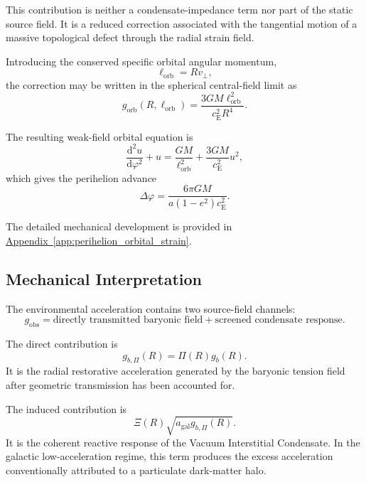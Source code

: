 This contribution is neither a condensate-impedance term nor part of the static source field. It is a reduced correction associated with the tangential motion of a massive topological defect through the radial strain field.

Introducing the conserved specific orbital angular momentum,
\begin{equation}
    \ell_{\mathrm{orb}} = Rv_\perp,
\end{equation}
the correction may be written in the spherical central-field limit as
\begin{equation}
    g_{\mathrm{orb}}(R,\ell_{\mathrm{orb}}) = \frac{3GM\ell_{\mathrm{orb}}^2}{c_{\mathrm{E}}^2R^4}.
\end{equation}

The resulting weak-field orbital equation is
\begin{equation}
    \frac{\mathrm{d}^2u}{\mathrm{d}\varphi^2} + u = \frac{GM}{\ell_{\mathrm{orb}}^2} + \frac{3GM}{c_{\mathrm{E}}^2}u^2,
\end{equation}
which gives the perihelion advance
\begin{equation}
    \Delta\varphi = \frac{6\pi GM}{a(1-e^2)c_{\mathrm{E}}^2}.
\end{equation}

The detailed mechanical development is provided in \hyperref[app:perihelion_orbital_strain]{Appendix~\ref*{app:perihelion_orbital_strain}}.

\subsection{Mechanical Interpretation}

The environmental acceleration contains two source-field channels:
\begin{equation}
    g_{\mathrm{obs}} = \text{directly transmitted baryonic field} + \text{screened condensate response}.
\end{equation}

The direct contribution is
\begin{equation}
    g_{b,\Pi}(R) = \Pi(R)g_b(R).
\end{equation}
It is the radial restorative acceleration generated by the baryonic tension field after geometric transmission has been accounted for.

The induced contribution is
\begin{equation}
    \Xi(R) \sqrt{ a_{\mathrm{gal}}g_{b,\Pi}(R) }.
\end{equation}
It is the coherent reactive response of the Vacuum Interstitial Condensate. In the galactic low-acceleration regime, this term produces the excess acceleration conventionally attributed to a particulate dark-matter halo.

